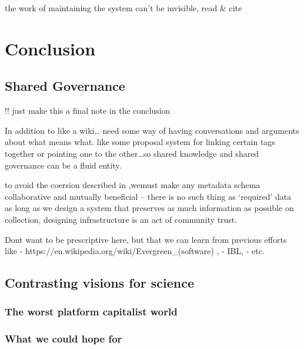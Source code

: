 \documentclass{article}
\begin{document}
the work of maintaining the system can't be invisible, read \& cite \cite{ classeDistributedInfrastructureSupport2017,
bowkerInformationInfrastructureStudies2010}

\hypertarget{conclusion}{%
\section{Conclusion}\label{conclusion}}

\hypertarget{shared-governance}{%
\subsection{Shared Governance}\label{shared-governance}}

!! just make this a final note in the conclusion

In addition to like a wiki\ldots{} need some way of having conversations
and arguments about what means what. like some proposal system for
linking certain tags together or pointing one to the other\ldots so
shared knowledge and shared governance can be a fluid entity.

to avoid the coersion described in \cite{bietzCollaborationMetagenomicsSequence2009},wemust make any
metadata schema collaborative and mutually beneficial -- there is no
such thing as `required' data as long as we design a system that
preserves as much information as possible on collection, designing
infrastructure is an act of community trust.

Dont want to be prescriptive here, but that we can learn from previous
efforts like - https://en.wikipedia.org/wiki/Evergreen\_(software) , -
IBL, - etc.

\hypertarget{contrasting-visions-for-science}{%
\subsection{Contrasting visions for
science}\label{contrasting-visions-for-science}}

\hypertarget{the-worst-platform-capitalist-world}{%
\subsubsection{The worst platform capitalist
world}\label{the-worst-platform-capitalist-world}}

\hypertarget{what-we-could-hope-for}{%
\subsubsection{What we could hope for}\label{what-we-could-hope-for}}
\end{document}
